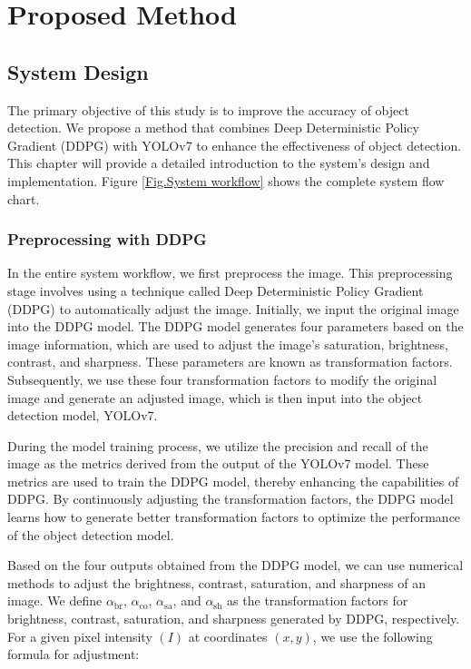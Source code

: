 \documentclass{PHlab-thesis}
\begin{document}
\chapter{Proposed Method}
\section{System Design}
The primary objective of this study is to improve the accuracy of object detection. We propose a method that combines Deep Deterministic Policy Gradient (DDPG) with YOLOv7 to enhance the effectiveness of object detection. This chapter will provide a detailed introduction to the system's design and implementation. Figure \ref{Fig.System workflow} shows the complete system flow chart.

\subsection{Preprocessing with DDPG}
In the entire system workflow, we first preprocess the image. This preprocessing stage involves using a technique called Deep Deterministic Policy Gradient (DDPG) to automatically adjust the image. Initially, we input the original image into the DDPG model. The DDPG model generates four parameters based on the image information, which are used to adjust the image's saturation, brightness, contrast, and sharpness. These parameters are known as transformation factors. Subsequently, we use these four transformation factors to modify the original image and generate an adjusted image, which is then input into the object detection model, YOLOv7.

During the model training process, we utilize the precision and recall of the image as the metrics derived from the output of the YOLOv7 model. These metrics are used to train the DDPG model, thereby enhancing the capabilities of DDPG. By continuously adjusting the transformation factors, the DDPG model learns how to generate better transformation factors to optimize the performance of the object detection model.

Based on the four outputs obtained from the DDPG model, we can use numerical methods to adjust the brightness, contrast, saturation, and sharpness of an image. We define $\alpha_{\text{br}}$, $\alpha_{\text{co}}$, $\alpha_{\text{sa}}$, and $\alpha_{\text{sh}}$ as the transformation factors for brightness, contrast, saturation, and sharpness generated by DDPG, respectively. For a given pixel intensity $(I)$ at coordinates $(x,y)$, we use the following formula for adjustment:
\end{document}
